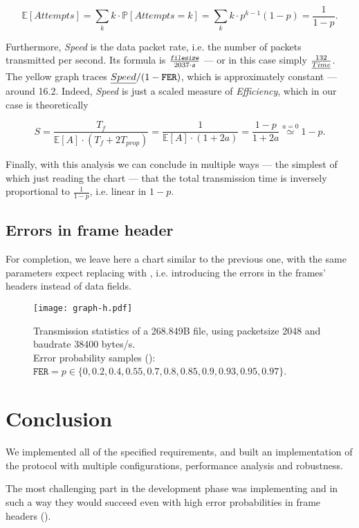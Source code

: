 \documentclass[main.tex]{subfiles}
\begin{document}
\begin{equation*}
	\mathbb{E}[Attempts] = \sum_k k\cdot \mathbb{P}[Attempts=k] = \sum_k k\cdot p^{k-1}(1-p)=\frac{1}{1-p}.
\end{equation*}

Furthermore, \emph{Speed} is the data packet rate, i.e. the number of packets transmitted per second. Its formula is $\tfrac{\var{filesize}}{2037 \cdot \var{s}}$ --- or in this case simply $\tfrac{132}{\emph{Time}}$. The yellow graph traces $\emph{Speed}/(1-\texttt{FER})$, which is approximately constant --- around 16.2. Indeed, \emph{Speed} is just a scaled measure of \emph{Efficiency}, which in our case is theoretically

\begin{equation*}
	S = \frac{T_f}{\mathbb{E}[A]\cdot(T_f + 2T_{prop})} = \frac{1}{\mathbb{E}[A]\cdot(1+2a)} = \frac{1-p}{1+2a} \stackrel{a=0}{\simeq} 1-p.
\end{equation*}

Finally, with this analysis we can conclude in multiple ways --- the simplest of which just reading the chart --- that the total transmission time is inversely proportional to $\tfrac{1}{1-p}$, i.e. linear in $1-p$.

\subsection{Errors in frame header}
\label{subsec:errheaders}

For completion, we leave here a chart similar to the previous one, with the same parameters expect replacing  with , i.e. introducing the errors in the frames' headers instead of data fields.

\begin{figure}[htbp]
	\texttt{[image: graph-h.pdf]}
	\caption{Transmission statistics of a 268.849B file, using packetsize 2048 and baudrate 38400 bytes/s.\\ Error probability samples (): $\texttt{FER}=p\in\{0,0.2,0.4,0.55,0.7,0.8,0.85,0.9,0.93,0.95,0.97\}$.}
	\label{fig:statistics-h}
\end{figure}

\section{Conclusion}
\label{sec:conclusion}

We implemented all of the specified requirements, and built an implementation of the protocol with multiple configurations, performance analysis and robustness.

The most challenging part in the development phase was implementing  and  in such a way they would succeed even with high error probabilities in frame headers ().
\end{document}
